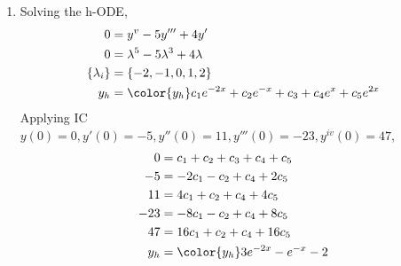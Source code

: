 \begin{enumerate}
    \item Solving the h-ODE,
          \begin{align}
              0               & = y^{v} - 5y''' + 4y'                            \\
              0               & = \lambda^{5} - 5\lambda^{3} + 4\lambda          \\
              \{\lambda_{i}\} & = \{-2, -1, 0, 1, 2\}                            \\
              y_{h}           & = \color{y_h} c_{1}e^{-2x} + c_{2}e^{-x} + c_{3}
              + c_{4}e^{x} + c_{5}e^{2x}
          \end{align}
          Applying IC $ y(0) = 0, y'(0) = -5, y''(0) = 11, y'''(0) = -23,
              y^{iv}(0) = 47 $,
          \begin{align}
              0     & = c_{1} + c_{2} + c_{3} + c_{4} + c_{5} \\
              -5    & = -2c_{1} - c_{2} + c_{4} + 2c_{5}      \\
              11    & = 4c_{1} + c_{2} + c_{4} + 4c_{5}       \\
              -23   & = -8c_{1} - c_{2} + c_{4} + 8c_{5}      \\
              47    & = 16c_{1} + c_{2} + c_{4} + 16c_{5}     \\
              y_{h} & = \color{y_h} 3e^{-2x} - e^{-x} - 2
          \end{align}
          \begin{figure}[H]
              \centering
          \end{figure}


\end{enumerate}
